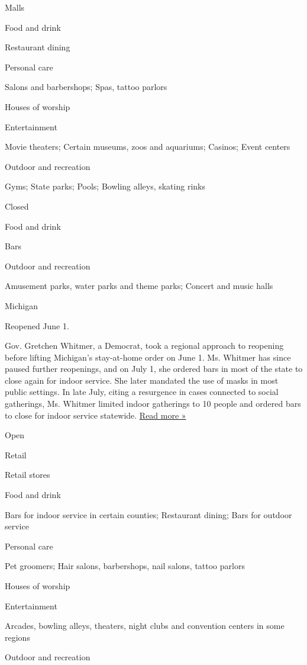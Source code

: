 Malls

Food and drink

Restaurant dining

Personal care

Salons and barbershops; Spas, tattoo parlors

Houses of worship

Entertainment

Movie theaters; Certain museums, zoos and aquariums; Casinos; Event
centers

Outdoor and recreation

Gyms; State parks; Pools; Bowling alleys, skating rinks

Closed

Food and drink

Bars

Outdoor and recreation

Amusement parks, water parks and theme parks; Concert and music halls

Michigan

Reopened June 1.

Gov. Gretchen Whitmer, a Democrat, took a regional approach to reopening
before lifting Michigan's stay-at-home order on June 1. Ms. Whitmer has
since paused further reopenings, and on July 1, she ordered bars in most
of the state to close again for indoor service. She later mandated the
use of masks in most public settings. In late July, citing a resurgence
in cases connected to social gatherings, Ms. Whitmer limited indoor
gatherings to 10 people and ordered bars to close for indoor service
statewide.
\href{https://www.freep.com/story/news/local/michigan/2020/07/29/detroit-casinos-reopening-michigan-restrictions/5537945002/}{Read
more »}

Open

Retail

Retail stores

Food and drink

Bars for indoor service in certain counties; Restaurant dining; Bars for
outdoor service

Personal care

Pet groomers; Hair salons, barbershops, nail salons, tattoo parlors

Houses of worship

Entertainment

Arcades, bowling alleys, theaters, night clubs and convention centers in
some regions

Outdoor and recreation

